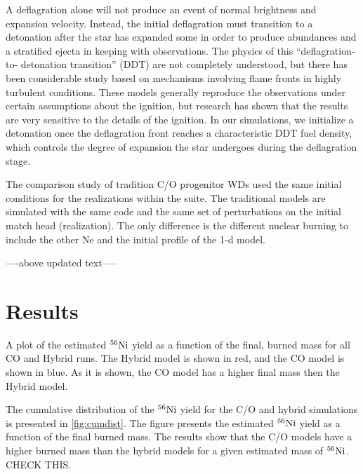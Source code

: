 \documentclass[iop,apj]{emulateapj}
\newcommand{\Ni}[1]{\ensuremath{{}^{#1}{\rm Ni}}}
\begin{document}
A deflagration alone will not produce an event of normal
brightness and expansion velocity. Instead, the initial
deflagration must transition to a detonation after the star has
expanded some in order to produce abundances and a stratified
ejecta in keeping with observations. The physics of this
“deflagration-to- detonation transition” (DDT) are not
completely understood, but there has been considerable study
based on mechanisms involving flame fronts in highly turbulent
conditions. These models generally reproduce the observations
under certain assumptions about the ignition, but research has
shown that the results are very sensitive to the details of the
ignition. In our simulations, we initialize a detonation once
the deflagration front reaches a characteristic DDT fuel density,
which controls the degree of expansion the star undergoes during
the deflagration stage.

The comparison study of tradition C/O progenitor WDs used the same initial
conditions for the realizations within the suite. The traditional models
are simulated with the same code and the same set of perturbations on the
initial match head (realization). The only difference is the different
nuclear burning to include the other Ne and the initial profile of the
1-d model.

----above updated text-----



\section{Results}

A plot of the estimated \Ni{56} yield as a function of the final, burned mass
for all CO and Hybrid runs. The Hybrid model is shown in red, and the CO
model is shown in blue. As it is shown, the CO model has a higher final mass
then the Hybrid model. 

The cumulative distribution of the \Ni{56} yield for the C/O and hybrid
simulations is presented in \ref{fig:cumdist}. 
The figure presents the estimated \Ni{56} yield as a function of the final burned 
mass. The results show that the C/O models have a higher burned mass than the
hybrid models for a given estimated mass of \Ni{56}. CHECK THIS.  
\end{document}
